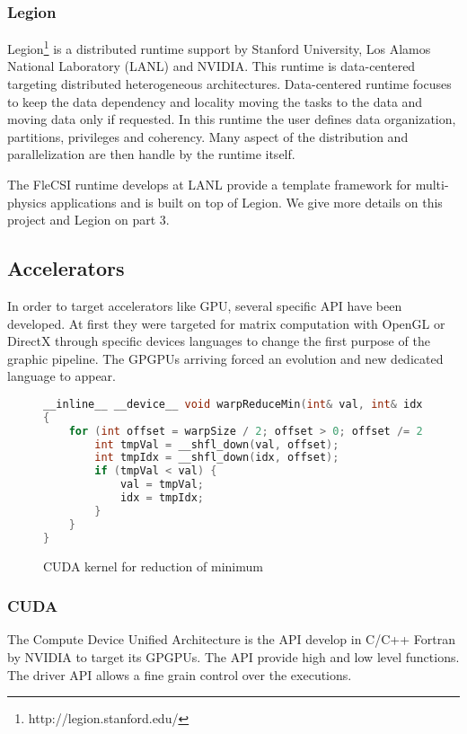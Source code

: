 \subsubsection{Legion}
Legion\footnote{http://legion.stanford.edu/} is a distributed runtime support by Stanford University, Los Alamos National Laboratory (LANL) and NVIDIA. 
This runtime is data-centered targeting distributed heterogeneous architectures. 
Data-centered runtime focuses to keep the data dependency and locality moving the tasks to the data and moving data only if requested. 
In this runtime the user defines data organization, partitions, privileges and coherency. 
Many aspect of the distribution and parallelization are then handle by the runtime itself.

The FleCSI runtime develops at LANL provide a template framework for multi-physics applications and is built on top of Legion. 
We give more details on this project and Legion on part 3.  

\subsection{Accelerators}
In order to target accelerators like GPU, several specific API have been developed. 
At first they were targeted for matrix computation with OpenGL or DirectX through specific devices languages to change the first purpose of the graphic pipeline. 
The GPGPUs arriving forced an evolution and new dedicated language to appear. 

\begin{figure}[t!]
\begin{lstlisting}[language=C]
__inline__ __device__ void warpReduceMin(int& val, int& idx)
{
    for (int offset = warpSize / 2; offset > 0; offset /= 2) {
        int tmpVal = __shfl_down(val, offset);
        int tmpIdx = __shfl_down(idx, offset);
        if (tmpVal < val) {
            val = tmpVal;
            idx = tmpIdx;
        }
    }
}
\end{lstlisting}
\caption{CUDA kernel for reduction of minimum}
\label{code:cuda_reduction}
\end{figure}

\subsubsection{CUDA}
\label{sec:CUDA}
The Compute Device Unified Architecture is the API develop in C/C++ Fortran by NVIDIA to target its GPGPUs. 
The API provide high and low level functions. 
The driver API allows a fine grain control over the executions.

